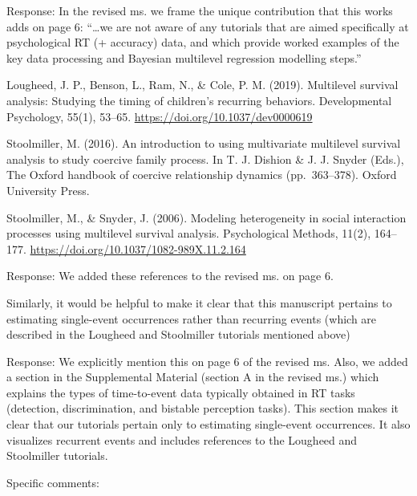 \documentclass[
]{article}
\renewenvironment{quote}{\begin{leftbar}}{\end{leftbar}}
\begin{document}
Response: In the revised ms. we frame the unique contribution that this
works adds on page 6: ``\ldots we are not aware of any tutorials that
are aimed specifically at psychological RT (+ accuracy) data, and which
provide worked examples of the key data processing and Bayesian
multilevel regression modelling steps.''

\begin{quote}
Lougheed, J. P., Benson, L., Ram, N., \& Cole, P. M. (2019). Multilevel
survival analysis: Studying the timing of children's recurring
behaviors. Developmental Psychology, 55(1), 53--65.
\url{https://doi.org/10.1037/dev0000619}
\end{quote}

\begin{quote}
Stoolmiller, M. (2016). An introduction to using multivariate multilevel
survival analysis to study coercive family process. In T. J. Dishion \&
J. J. Snyder (Eds.), The Oxford handbook of coercive relationship
dynamics (pp.~363--378). Oxford University Press.
\end{quote}

\begin{quote}
Stoolmiller, M., \& Snyder, J. (2006). Modeling heterogeneity in social
interaction processes using multilevel survival analysis. Psychological
Methods, 11(2), 164--177.
\url{https://doi.org/10.1037/1082-989X.11.2.164}
\end{quote}

Response: We added these references to the revised ms. on page 6.

\begin{quote}
Similarly, it would be helpful to make it clear that this manuscript
pertains to estimating single-event occurrences rather than recurring
events (which are described in the Lougheed and Stoolmiller tutorials
mentioned above)
\end{quote}

Response: We explicitly mention this on page 6 of the revised ms. Also,
we added a section in the Supplemental Material (section A in the
revised ms.) which explains the types of time-to-event data typically
obtained in RT tasks (detection, discrimination, and bistable perception
tasks). This section makes it clear that our tutorials pertain only to
estimating single-event occurrences. It also visualizes recurrent events
and includes references to the Lougheed and Stoolmiller tutorials.

\begin{quote}
Specific comments:
\end{quote}
\end{document}
